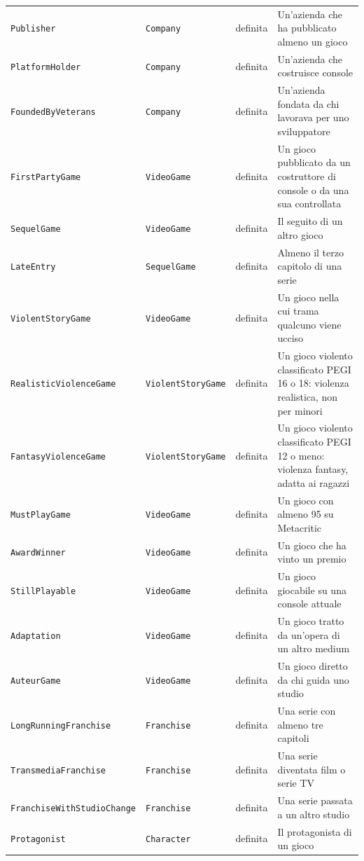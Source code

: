 \begin{longtable}{lllp{5.8cm}}
\texttt{Publisher} & \texttt{Company} & definita & Un'azienda che ha pubblicato almeno un gioco \\
\texttt{PlatformHolder} & \texttt{Company} & definita & Un'azienda che costruisce console \\
\texttt{FoundedByVeterans} & \texttt{Company} & definita & Un'azienda fondata da chi lavorava per uno sviluppatore \\
\texttt{FirstPartyGame} & \texttt{VideoGame} & definita & Un gioco pubblicato da un costruttore di console o da una sua controllata \\
\texttt{SequelGame} & \texttt{VideoGame} & definita & Il seguito di un altro gioco \\
\texttt{LateEntry} & \texttt{SequelGame} & definita & Almeno il terzo capitolo di una serie \\
\texttt{ViolentStoryGame} & \texttt{VideoGame} & definita & Un gioco nella cui trama qualcuno viene ucciso \\
\texttt{RealisticViolenceGame} & \texttt{ViolentStoryGame} & definita & Un gioco violento classificato PEGI 16 o 18: violenza realistica, non per minori \\
\texttt{FantasyViolenceGame} & \texttt{ViolentStoryGame} & definita & Un gioco violento classificato PEGI 12 o meno: violenza fantasy, adatta ai ragazzi \\
\texttt{MustPlayGame} & \texttt{VideoGame} & definita & Un gioco con almeno 95 su Metacritic \\
\texttt{AwardWinner} & \texttt{VideoGame} & definita & Un gioco che ha vinto un premio \\
\texttt{StillPlayable} & \texttt{VideoGame} & definita & Un gioco giocabile su una console attuale \\
\texttt{Adaptation} & \texttt{VideoGame} & definita & Un gioco tratto da un'opera di un altro medium \\
\texttt{AuteurGame} & \texttt{VideoGame} & definita & Un gioco diretto da chi guida uno studio \\
\texttt{LongRunningFranchise} & \texttt{Franchise} & definita & Una serie con almeno tre capitoli \\
\texttt{TransmediaFranchise} & \texttt{Franchise} & definita & Una serie diventata film o serie TV \\
\texttt{FranchiseWithStudioChange} & \texttt{Franchise} & definita & Una serie passata a un altro studio \\
\texttt{Protagonist} & \texttt{Character} & definita & Il protagonista di un gioco \\

\end{longtable}
